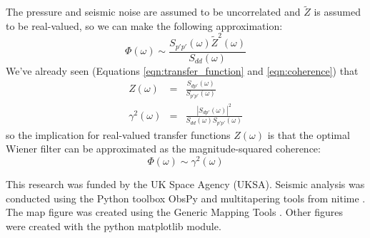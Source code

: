 \noindent The pressure and seismic noise are assumed to be uncorrelated and $\widetilde{Z}$ is assumed to be real-valued, so we can make the following approximation:
\begin{equation}
  \Phi (\omega) \sim \frac{ S_{p'p'} (\omega) \widetilde{Z}^2 (\omega)}{S_{dd} (\omega)}
  \label{eqn:approx_filter}
\end{equation}
\noindent We've already seen (Equations \ref{eqn:transfer_function} and \ref{eqn:coherence}) that
\begin{eqnarray}
  Z(\omega) &=& \frac{S_{dp'} (\omega)}{S_{p'p'} (\omega)} \\
  \gamma^2 (\omega) &=& \frac{ \left| S_{dp'} (\omega) \right|^2}{S_{dd} (\omega)S_{p'p'} (\omega)}
\end{eqnarray}
\noindent so the implication for real-valued transfer functions $Z (\omega)$ is that the optimal Wiener filter can be approximated as the magnitude-squared coherence:
\begin{equation}
  \Phi (\omega) \sim \gamma^2 (\omega)
  \label{eqn:optimal_filter}
\end{equation}



\begin{acknowledgements}
  This research was funded by the UK Space Agency (UKSA). 
  Seismic analysis was conducted using the Python toolbox ObsPy \citep{Beyreuther2010} and multitapering tools from nitime \citep{Rokem2009}.
  The map figure was created using the Generic Mapping Tools \citep{Wessel2013}. Other figures were created with the python matplotlib module.
\end{acknowledgements}









\grid
